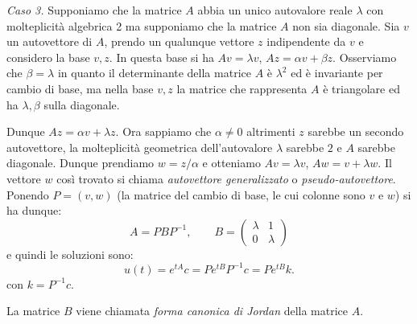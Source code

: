 \documentclass[italian,a4paper]{scrartcl}
\begin{document}
\emph{Caso 3.} 
Supponiamo che la matrice $A$ abbia un unico autovalore reale
$\lambda$ con molteplicità algebrica 2 ma supponiamo che la matrice
$A$ non sia diagonale. Sia $v$ un autovettore di $A$,
prendo un qualunque vettore $z$ indipendente da $v$ e considero
la base $v,z$. In questa base si ha $Av = \lambda v$, $Az = \alpha v +
\beta z$. Osserviamo che $\beta = \lambda$ in quanto il determinante
della matrice $A$ è $\lambda^2$ ed è invariante per cambio di
base, ma nella base $v,z$ la matrice che rappresenta $A$ è triangolare
ed ha $\lambda,\beta$ sulla diagonale. 

Dunque $Az = \alpha v + \lambda z$. Ora sappiamo
che $\alpha\neq 0$ altrimenti $z$ sarebbe un secondo autovettore,
la molteplicità geometrica dell'autovalore $\lambda$ sarebbe $2$ e $A$
sarebbe diagonale. Dunque
prendiamo $w=z / \alpha$ e otteniamo $Av=\lambda v$, $Aw = v +
\lambda w$. Il vettore $w$ così trovato si chiama \emph{autovettore
  generalizzato} o \emph{pseudo-autovettore}. Ponendo $P=(v,w)$ (la
matrice del cambio di base, le cui colonne sono $v$ e $w$) si ha dunque:
\[
A = P B P^{-1}, \qquad B=\begin{pmatrix}\lambda & 1 \\ 0 & \lambda \end{pmatrix}
\]
e quindi le soluzioni sono:
\[
u(t) = e^{tA}c = P e^{tB}P^{-1}c = P e^{tB}k.
\]
con $k=P^{-1}c$.

La matrice $B$ viene chiamata \emph{forma canonica di Jordan} della matrice $A$.
\end{document}
